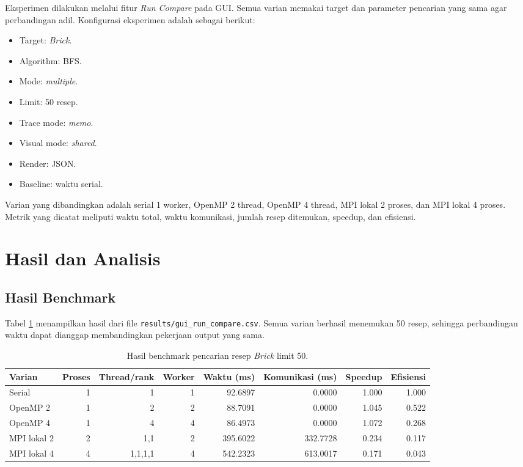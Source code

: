 \documentclass[conference]{IEEEtran}
\begin{document}
Eksperimen dilakukan melalui fitur \textit{Run Compare} pada GUI. Semua varian memakai target dan parameter pencarian yang sama agar perbandingan adil. Konfigurasi eksperimen adalah sebagai berikut:

\begin{itemize}
  \item Target: \textit{Brick}.
  \item Algorithm: BFS.
  \item Mode: \textit{multiple}.
  \item Limit: 50 resep.
  \item Trace mode: \textit{memo}.
  \item Visual mode: \textit{shared}.
  \item Render: JSON.
  \item Baseline: waktu serial.
\end{itemize}

Varian yang dibandingkan adalah serial 1 worker, OpenMP 2 thread, OpenMP 4 thread, MPI lokal 2 proses, dan MPI lokal 4 proses. Metrik yang dicatat meliputi waktu total, waktu komunikasi, jumlah resep ditemukan, speedup, dan efisiensi.

\section{Hasil dan Analisis}

\subsection{Hasil Benchmark}

Tabel \ref{tab:benchmark} menampilkan hasil dari file \texttt{results/gui\_run\_compare.csv}. Semua varian berhasil menemukan 50 resep, sehingga perbandingan waktu dapat dianggap membandingkan pekerjaan output yang sama.

\begin{table}[!t]
\centering
\caption{Hasil benchmark pencarian resep \textit{Brick} limit 50.}
\label{tab:benchmark}
\footnotesize
\begin{tabular}{lrrrrrrr}
\toprule
Varian & Proses & Thread/rank & Worker & Waktu (ms) & Komunikasi (ms) & Speedup & Efisiensi \\
\midrule
Serial & 1 & 1 & 1 & 92.6897 & 0.0000 & 1.000 & 1.000 \\
OpenMP 2 & 1 & 2 & 2 & 88.7091 & 0.0000 & 1.045 & 0.522 \\
OpenMP 4 & 1 & 4 & 4 & 86.4973 & 0.0000 & 1.072 & 0.268 \\
MPI lokal 2 & 2 & 1,1 & 2 & 395.6022 & 332.7728 & 0.234 & 0.117 \\
MPI lokal 4 & 4 & 1,1,1,1 & 4 & 542.2323 & 613.0017 & 0.171 & 0.043 \\
\bottomrule
\end{tabular}
\end{table}
\end{document}

